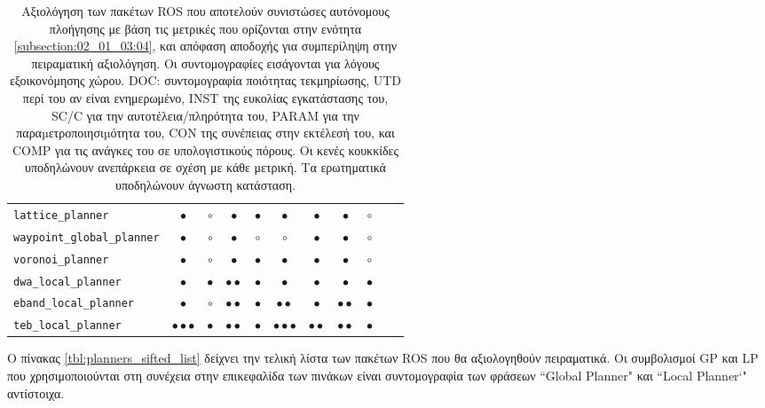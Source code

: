 \begin{table}
\begin{tabular}{lccccccccc|c}
  \texttt{lattice\_planner}          & $\bullet$                 & $\circ$     & $\bullet$         & $\bullet$ & $\bullet$               & $\bullet$        & $\bullet$               & $\circ$      \\
  \texttt{waypoint\_global\_planner} & $\bullet$                 & $\circ$     & $\bullet$         & $\circ$   & $\circ$                 & $\bullet$        & $\bullet$               & $\circ$      \\
  \texttt{voronoi\_planner}          & $\bullet$                 & $\circ$     & $\bullet$         & $\bullet$ & $\bullet$               & $\bullet$        & $\bullet$               & $\circ$      \\ \midrule
  \texttt{dwa\_local\_planner}       & $\bullet$                 & $\bullet$   & $\bullet\bullet$  & $\bullet$ & $\bullet$               & $\bullet$        & $\bullet$               & $\bullet$    \\
  \texttt{eband\_local\_planner}     & $\bullet$                 & $\circ$     & $\bullet\bullet$  & $\bullet$ & $\bullet\bullet$        & $\bullet$        & $\bullet\bullet$        & $\bullet$    \\
  \texttt{teb\_local\_planner}       & $\bullet\bullet\bullet$   & $\bullet$   & $\bullet\bullet$  & $\bullet$ & $\bullet\bullet\bullet$ & $\bullet\bullet$ & $\bullet\bullet$        & $\bullet$    \\ \bottomrule
\end{tabular}
\caption{\small Αξιολόγηση των πακέτων ROS που αποτελούν συνιστώσες αυτόνομους
         πλοήγησης με βάση τις μετρικές που ορίζονται στην ενότητα
         \ref{subsection:02_01_03:04}, και απόφαση αποδοχής για συμπερίληψη στην
         πειραματική αξιολόγηση. Οι συντομογραφίες εισάγονται για λόγους
         εξοικονόμησης χώρου. DOC: συντομογραφία ποιότητας τεκμηρίωσης, UTD
         περί του αν είναι ενημερωμένο, INST της ευκολίας εγκατάστασης του,
         SC/C για την αυτοτέλεια/πληρότητα του, PARAM για την
         παραµετροποιησιµότητα του, CON της συνέπειας στην εκτέλεσή του, και COMP
         για τις ανάγκες του σε υπολογιστικούς πόρους. Οι κενές κουκκίδες
         υποδηλώνουν ανεπάρκεια σε σχέση με κάθε μετρική. Τα ερωτηματικά
         υποδηλώνουν άγνωστη κατάσταση.}
\label{tbl:qualitative_metrics}
\end{table}

Ο πίνακας \ref{tbl:planners_sifted_list} δείχνει την τελική λίστα των πακέτων
ROS που θα αξιολογηθούν πειραματικά. Οι συμβολισμοί GP και LP που
χρησιμοποιούνται στη συνέχεια στην επικεφαλίδα των πινάκων είναι συντομογραφία
των φράσεων ``Global Planner" και ``Local Planner`" αντίστοιχα.

